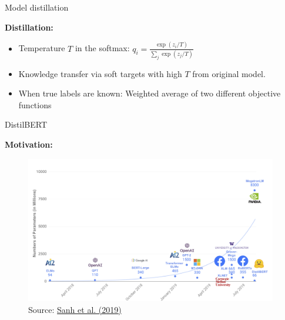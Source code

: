 \begin{frame}{Model distillation \href{https://arxiv.org/pdf/1503.02531.pdf}{}}

\vfill

\textbf{Distillation:}

\begin{itemize}
	\item Temperature $T$ in the softmax: $q_i = \frac{\exp(z_i/T)}{\sum_j \exp(z_j/T)}$
	\item Knowledge transfer via soft targets with high $T$ from original model.
	\item When true labels are known: Weighted average of two different objective functions
\end{itemize}

\vfill

\end{frame}


\begin{frame}{DistilBERT \href{https://arxiv.org/pdf/1910.01108.pdf}{}}

\textbf{Motivation:}
	\begin{figure}
		\centering
		\includegraphics[width = 11cm]{figure/distilbert-motivation}\\ 
		{\footnotesize Source: \href{https://arxiv.org/pdf/1910.01108.pdf}{Sanh et al. (2019)}}
	\end{figure}
	
\end{frame}


